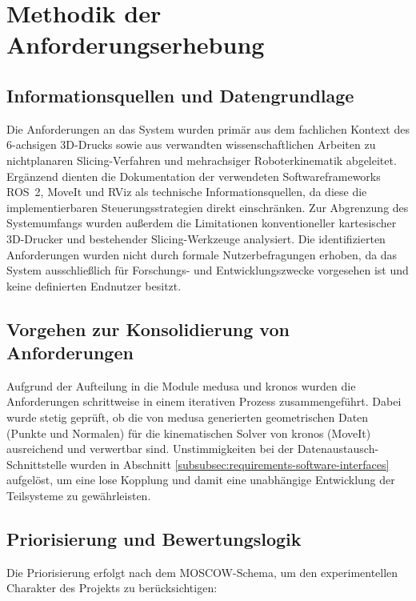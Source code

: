     \section{Methodik der Anforderungserhebung}\label{sec:requirements-elicitation-methodology}
        \subsection{Informationsquellen und Datengrundlage}\label{subsec:information-sources-and-data-basis}
            Die Anforderungen an das System wurden primär aus dem fachlichen Kontext des 6-achsigen 3D-Drucks sowie aus verwandten wissenschaftlichen Arbeiten zu nichtplanaren Slicing-Verfahren und mehrachsiger Roboterkinematik abgeleitet.
            Ergänzend dienten die Dokumentation der verwendeten Softwareframeworks \ac{ROS}~2, MoveIt und RViz als technische Informationsquellen, da diese die implementierbaren Steuerungsstrategien direkt einschränken.
            Zur Abgrenzung des Systemumfangs wurden außerdem die Limitationen konventioneller kartesischer 3D-Drucker und bestehender Slicing-Werkzeuge analysiert.
            Die identifizierten Anforderungen wurden nicht durch formale Nutzerbefragungen erhoben, da das System ausschließlich für Forschungs- und Entwicklungszwecke vorgesehen ist
            und keine definierten Endnutzer besitzt.

        \subsection{Vorgehen zur Konsolidierung von Anforderungen} \label{subsec:approach-for-consolidating-requirements}
            Aufgrund der Aufteilung in die Module \ac{medusa} und \ac{kronos} wurden die Anforderungen schrittweise in einem iterativen Prozess zusammengeführt.
            Dabei wurde stetig geprüft, ob die von \ac{medusa} generierten geometrischen Daten (Punkte und Normalen)
            für die kinematischen Solver von \ac{kronos} (MoveIt) ausreichend und verwertbar sind.
            Unstimmigkeiten bei der Datenaustausch-Schnittstelle wurden in Abschnitt \ref{subsubsec:requirements-software-interfaces} aufgelöst,
            um eine lose Kopplung und damit eine unabhängige Entwicklung der Teilsysteme zu gewährleisten.

        \subsection{Priorisierung und Bewertungslogik}\label{subsec:prioritization-and-evaluation-logic}
            Die Priorisierung erfolgt nach dem \ac{MOSCOW}-Schema, um den experimentellen Charakter des Projekts zu berücksichtigen:
